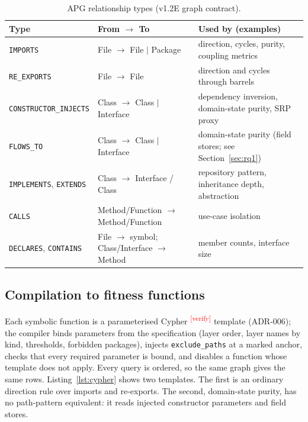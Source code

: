 \documentclass[10pt,a4paper]{article}
\newcommand{\citeneeded}[1]{\cite{#1}\textsuperscript{\textcolor{red}{\tiny[verify]}}}
\newcommand{\edge}[1]{\texttt{\small #1}}
\begin{document}
\begin{table}[t]
\centering
\caption{APG relationship types (v1.2E graph contract).}
\label{tab:apg}
\small
\begin{tabularx}{\linewidth}{@{}l l X@{}}
\toprule
Type & From $\rightarrow$ To & Used by (examples) \\
\midrule
\edge{IMPORTS} & File $\rightarrow$ File $|$ Package & direction, cycles, purity, coupling metrics \\
\edge{RE\_EXPORTS} & File $\rightarrow$ File & direction and cycles through barrels \\
\edge{CONSTRUCTOR\_INJECTS} & Class $\rightarrow$ Class $|$ Interface & dependency inversion, domain-state purity, SRP proxy \\
\edge{FLOWS\_TO} & Class $\rightarrow$ Class $|$ Interface & domain-state purity (field stores; see Section~\ref{sec:rq1}) \\
\edge{IMPLEMENTS}, \edge{EXTENDS} & Class $\rightarrow$ Interface / Class & repository pattern, inheritance depth, abstraction \\
\edge{CALLS} & Method/Function $\rightarrow$ Method/Function & use-case isolation \\
\edge{DECLARES}, \edge{CONTAINS} & File $\rightarrow$ symbol; Class/Interface $\rightarrow$ Method & member counts, interface size \\
\bottomrule
\end{tabularx}
\end{table}

\subsection{Compilation to fitness functions}\label{sec:compile}

Each symbolic function is a parameterised Cypher \citeneeded{francis2018cypher} template (ADR-006); the compiler binds parameters from the
specification (layer order, layer names by kind, thresholds, forbidden packages), injects \texttt{exclude\_paths} at a
marked anchor, checks that every required parameter is bound, and disables a function whose template does not apply.
Every query is ordered, so the same graph gives the same rows. Listing~\ref{lst:cypher} shows two templates. The
first is an ordinary direction rule over imports and re-exports. The second, domain-state purity, has no
path-pattern equivalent: it reads injected constructor parameters and field stores.
\end{document}
